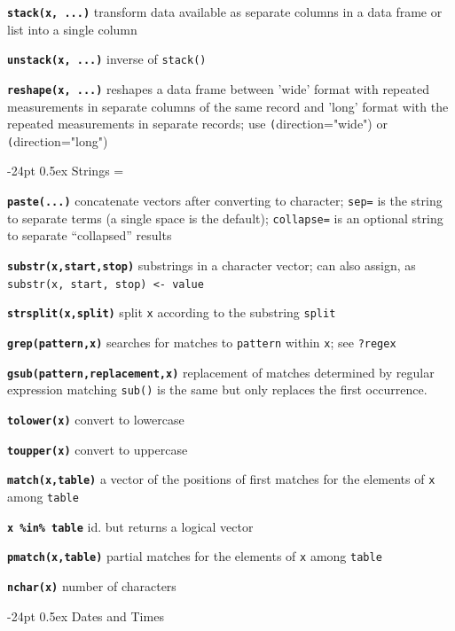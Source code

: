 \documentclass[10pt,landscape]{article}
\makeatletter
\renewcommand\section{\@startsection{section}{1}{0mm}%
                                     {-24pt}%
                                     {0.5ex}%
                                {\color{blue}\normalfont\large\bfseries}}
\newcommand{\code}{\texttt}
\newcommand{\bcode}[1]{\texttt{\textbf{#1}}}
\makeatother
\begin{document}
\begin{multicols*}{3}
\bcode{stack(x, ...)} transform data available as
     separate columns in a data frame or list into a single column

\bcode{unstack(x, ...)} inverse of \code{stack()}

\bcode{reshape(x, ...)} reshapes a data frame between 'wide' format with
     repeated measurements in separate columns of the same record and
     'long' format with the repeated measurements in separate records;
     use \code(direction="wide") or \code(direction="long")





\section{Strings}
\everypar={\hangindent=9mm}

\bcode{paste(...)} concatenate vectors after converting to character;
\code{sep=} is the string to separate terms (a single space is the default);
\code{collapse=} is an optional string to separate ``collapsed'' results

\bcode{substr(x,start,stop)} substrings in a character vector; can also assign, as \code{substr(x, start, stop) <- value}

\bcode{strsplit(x,split)} split \code{x} according to the substring \code{split}

\bcode{grep(pattern,x)} searches for matches to \code{pattern}
     within \code{x}; see \code{?regex}

\bcode{gsub(pattern,replacement,x)} replacement of matches determined by
regular expression matching \code{sub()} is the same but only
replaces the first occurrence. 

\bcode{tolower(x)} convert to lowercase

\bcode{toupper(x)} convert to uppercase

\bcode{match(x,table)} a vector of the positions of first matches for the elements of \code{x} among \code{table}

\bcode{x \%in\% table} id. but returns a logical vector 

\bcode{pmatch(x,table)} partial matches for the elements of \code{x} among \code{table}

\bcode{nchar(x)} number of characters


\section{\color{blue}Dates and Times}


\end{multicols*}
\end{document}
